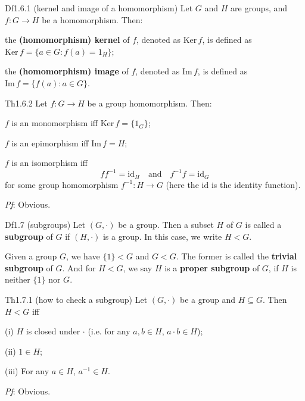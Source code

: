 \documentclass{article}
\newcommand{\Ker}{\text{Ker}\,}
\newcommand{\Ima}{\text{Im}\,}
\begin{document}
\begin{Df}{Df1.6.1 (kernel and image of a homomorphism)}
    Let $G$ and $H$ are groups, and $f: G\to H$ be a homomorphism. Then:
    \begin{compactenum}
        \item the \textbf{(homomorphism) kernel} of $f$, denoted as $\Ker f$, is defined as $\Ker f = \{a\in G: f(a) = 1_H\}$;
        \item the \textbf{(homomorphism) image} of $f$, denoted as $\Ima f$, is defined as $\Ima f = \{f(a): a\in G\}$.
    \end{compactenum}
\end{Df}

\begin{Th}{Th1.6.2}
    Let $f: G\to H$ be a group homomorphism. Then:
    \begin{compactenum}
        \item $f$ is an monomorphism iff $\Ker f = \{1_G\}$;
        \item $f$ is an epimorphism iff $\Ima f = H$;
        \item $f$ is an isomorphism iff 
        $$ ff^{-1} = \mathrm{id}_H \quad \text{and} \quad f^{-1}f = \mathrm{id}_G $$
        for some group homomorphism $f^{-1}: H\to G$ (here the $\mathrm{id}$ is the identity function).
    \end{compactenum}
    \tcblower
    \textit{Pf}: Obvious.
\end{Th}

\begin{Df}{Df1.7 (subgroups)}
    Let $(G, \cdot)$ be a group. Then a subset $H$ of $G$ is called a \textbf{subgroup} of $G$ if $(H, \cdot)$ is a group. In this case, we write $H < G$.
\end{Df}

\begin{Rmk}{}
    \begin{compactenum}
        \item \textcolor{Th}{Given a group $G$, we have $\{1\} < G$ and $G < G$.} \textcolor{Df}{The former is called the \textbf{trivial subgroup} of $G$.} And \textcolor{Df}{for $H < G$, we say $H$ is a \textbf{proper subgroup} of $G$, if $H$ is neither $\{1\}$ nor $G$.}
    \end{compactenum}
\end{Rmk}

\begin{Th}{Th1.7.1 (how to check a subgroup)}
    Let $(G, \cdot)$ be a group and $H\subseteq G$. Then $H < G$ iff
    \begin{compactenum}
        \item[(i)] $H$ is closed under $\cdot$\; (i.e. for any $a, b\in H$, $a\cdot b\in H$);
        \item[(ii)] $1\in H$;
        \item[(iii)] For any $a\in H$, $a^{-1}\in H$.
    \end{compactenum}
    \tcblower
    \textit{Pf}: Obvious.
\end{Th}
\end{document}
